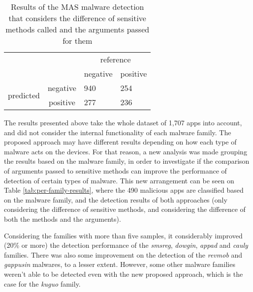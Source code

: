\begin{table}[]
\centering
\caption{Results of the MAS malware detection that considers the difference of sensitive methods called and the arguments passed for them}
\label{tab:new-confusion-matrix}
\begin{tabular}{llll}
                                                &                               & \multicolumn{2}{c}{reference}                                 \\ \cline{3-4} 
                                                & \multicolumn{1}{l|}{}         & \multicolumn{1}{c|}{negative} & \multicolumn{1}{c|}{positive} \\ \cline{2-4} 
\multicolumn{1}{c|}{\multirow{2}{*}{predicted}} & \multicolumn{1}{c|}{negative} & \multicolumn{1}{l|}{940}      & \multicolumn{1}{l|}{254}      \\ \cline{2-4} 
\multicolumn{1}{c|}{}                           & \multicolumn{1}{c|}{positive} & \multicolumn{1}{l|}{277}      & \multicolumn{1}{l|}{236}      \\ \cline{2-4} 
\end{tabular}
\end{table}

The results presented above take the whole dataset of 1,707 apps into account, and did not consider the internal functionality of each malware family. The proposed approach may have different results depending on how each type of malware acts on the devices. For that reason, a new analysis was made grouping the results based on the malware family, in order to investigate if the comparison of arguments passed to sensitive methods can improve the performance of detection of certain types of malware. This new arrangement can be seen on Table \ref{tab:per-family-results}, where the 490 malicious apps are classified based on the malware family, and the detection results of both approaches (only considering the difference of sensitive methods, and considering the difference of both the methods and the arguments).

Considering the families with more than five samples, it considerably improved (20\% or more) the detection performance of the \textit{smsreg}, \textit{dowgin}, \textit{appad} and \textit{cauly} families. There was also some improvement on the detection of the \textit{revmob} and \textit{gappusin} malwares, to a lesser extent. However, some other malware families weren't able to be detected even with the new proposed approach, which is the case for the \textit{kuguo} family.

